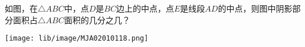如图，在$\triangle ABC$中，点$D$是$BC$边上的中点，点$E$是线段$AD$的中点，则图中阴影部分面积占$\triangle ABC$面积的几分之几？\\
\begin{flushright}
\texttt{[image: lib/image/MJA02010118.png]}
\end{flushright}